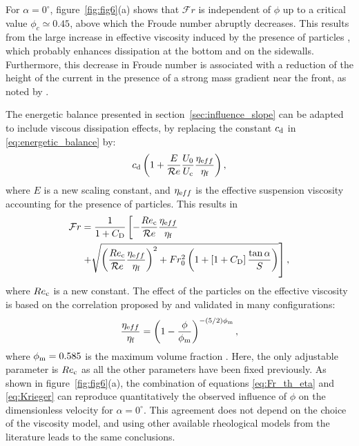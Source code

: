 \documentclass[12pt]{article}
\begin{document}
For $\alpha=0^\circ$, figure~\ref{fig:fig6}(a) shows that $\mathcal{F}r$ is independent of $\phi$ up to a critical value $\phi_{c} \simeq 0.45$, above which the Froude number abruptly decreases. This results from the large increase in effective viscosity induced by the presence of particles \citep{stickel2005fluid}, which probably enhances dissipation at the bottom and on the sidewalls. Furthermore, this decrease in Froude number is associated with a reduction of the height of the current in the presence of a strong mass gradient near the front, as noted by \citet{Schneider2023}.


The energetic balance presented in section~\ref{sec:influence_slope} can be adapted to include viscous dissipation effects, by replacing the constant $c_{\text d}$ in \eqref{eq:energetic_balance} by:
\begin{equation}
	c_{\text d}\left(1 + \frac{E}{\mathcal{R}e}\frac{U_0}{U_{\text c}}\frac{\eta_{\text eff}}{\eta_{\text f}} \right),
\end{equation}
where $E$ is a new scaling constant, and $\eta_{\text eff}$ is the effective suspension viscosity accounting for the presence of particles. This results in
\begin{equation}
	\label{eq:Fr_th_eta}
	\begin{split}
		\mathcal{F}r & =  \frac{1}{1 + C_{\text D}} \left[-\frac{Re_{\text c}}{\mathcal{R}e}\frac{\eta_{\text eff}}{\eta_{\text f}} \right. \\
		&\left. +\sqrt{\left(\frac{Re_{\text c}}{\mathcal{R}e}\frac{\eta_{\text eff}}{\eta_{\text f}} \right)^{2} + Fr_0^{2} \left(1 + \left[1 + C_{\text D}\right]\frac{\tan\alpha}{S} \right)}  \right],
	\end{split}
\end{equation}
where $Re_{\text c}$ is a new constant. The effect of the particles on the effective viscosity is based on the correlation proposed by \citet{krieger1959mechanism} and validated in many configurations:
\begin{equation}
	\label{eq:Krieger}
	\frac{\eta_{\text eff}}{\eta_{\text f}} = \left(1 - \frac{\phi}{\phi_{\text m}}\right)^{-(5/2)\phi_{\text m}},
\end{equation}
where $\phi_{\text m} = 0.585$ is the maximum volume fraction \citep{boyer2011unifying}.
%
Here, the only adjustable parameter is $Re_{\text c}$ as all the other parameters have been fixed previously. As shown in figure~\ref{fig:fig6}(a), the combination of equations \eqref{eq:Fr_th_eta} and \eqref{eq:Krieger} can reproduce quantitatively the observed influence of $\phi$ on the dimensionless velocity for $\alpha=0^\circ$. This agreement does not depend on the choice of the viscosity model, and using other available rheological models from the literature \citep{stickel2005fluid, boyer2011unifying} leads to the same conclusions.
\end{document}
